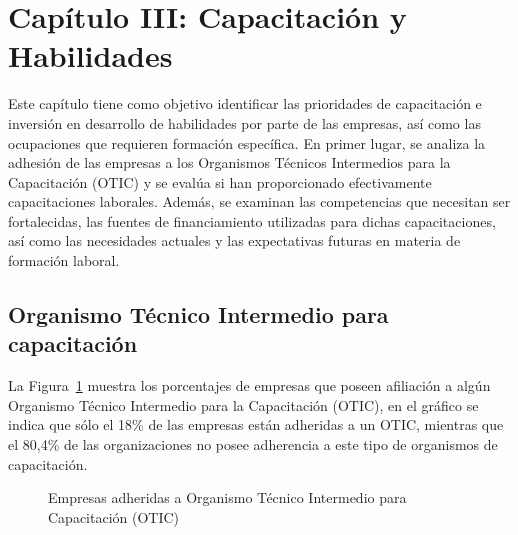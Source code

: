 \documentclass[
  11pt,
]{article}
\begin{document}
\newpage

\section{Capítulo III: Capacitación y
Habilidades}\label{capuxedtulo-iii-capacitaciuxf3n-y-habilidades}

Este capítulo tiene como objetivo identificar las prioridades de
capacitación e inversión en desarrollo de habilidades por parte de las
empresas, así como las ocupaciones que requieren formación específica.
En primer lugar, se analiza la adhesión de las empresas a los Organismos
Técnicos Intermedios para la Capacitación (OTIC) y se evalúa si han
proporcionado efectivamente capacitaciones laborales. Además, se
examinan las competencias que necesitan ser fortalecidas, las fuentes de
financiamiento utilizadas para dichas capacitaciones, así como las
necesidades actuales y las expectativas futuras en materia de formación
laboral.

\subsection{Organismo Técnico Intermedio para
capacitación}\label{organismo-tuxe9cnico-intermedio-para-capacitaciuxf3n}

La Figura~\ref{fig-otic} muestra los porcentajes de empresas que poseen
afiliación a algún Organismo Técnico Intermedio para la Capacitación
(OTIC), en el gráfico se indica que sólo el 18\% de las empresas están
adheridas a un OTIC, mientras que el 80,4\% de las organizaciones no
posee adherencia a este tipo de organismos de capacitación.

\begin{figure}[H]

\caption{\label{fig-otic}Empresas adheridas a Organismo Técnico
Intermedio para Capacitación (OTIC)}


\end{figure}%
\end{document}
